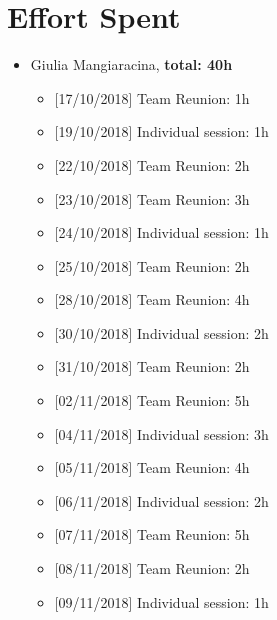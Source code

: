 \chapter{Effort Spent}

\begin{itemize}
\item Giulia Mangiaracina, \textbf{total: 40h} 
\begin{itemize}
    \item {[}17/10/2018{]} Team Reunion: 1h
    \item {[}19/10/2018{]} Individual session: 1h
    \item {[}22/10/2018{]} Team Reunion: 2h
    \item {[}23/10/2018{]} Team Reunion: 3h
    \item {[}24/10/2018{]} Individual session: 1h
    \item {[}25/10/2018{]} Team Reunion: 2h
    \item {[}28/10/2018{]} Team Reunion: 4h
    \item {[}30/10/2018{]} Individual session: 2h
    \item {[}31/10/2018{]} Team Reunion: 2h
    \item {[}02/11/2018{]} Team Reunion:  5h
    \item {[}04/11/2018{]} Individual session: 3h
    \item {[}05/11/2018{]} Team Reunion:  4h
    \item {[}06/11/2018{]} Individual session: 2h
    \item {[}07/11/2018{]} Team Reunion: 5h
    \item {[}08/11/2018{]} Team Reunion: 2h
    \item {[}09/11/2018{]} Individual session: 1h
\end{itemize}


\end{itemize}
